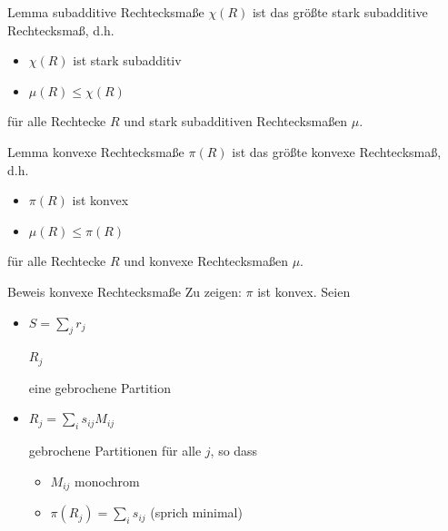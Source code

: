 \begin{frame}{}
    \begin{block}{Lemma subadditive Rechtecksma\ss{}e}
        $\chi(R)$ ist das gr\"o\ss{}te stark subadditive Rechtecksma\ss{}, d.h.
        \begin{itemize}
            \item $\chi(R)$ ist stark subadditiv
            \item $\mu(R) \leq \chi(R)$
        \end{itemize}
        f\"ur alle Rechtecke $R$ und stark subadditiven Rechtecksma\ss{}en $\mu$.
    \end{block}
    \pause
    \begin{block}{Lemma konvexe Rechtecksma\ss{}e}
        $\pi(R)$ ist das gr\"o\ss{}te konvexe Rechtecksma\ss{}, d.h.
        \begin{itemize}
            \item $\pi(R)$ ist konvex
            \item $\mu(R) \leq \pi(R)$
        \end{itemize}
        f\"ur alle Rechtecke $R$ und konvexe Rechtecksma\ss{}en $\mu$.
    \end{block}
\end{frame}

\begin{frame}[t]{Beweis konvexe Rechtecksma\ss{}e}
    Zu zeigen: $\pi$ ist konvex.
    \pause
    Seien
    \begin{itemize}
        \item $S = \sum_{j} r_j$ \colorbox{dominant_blue}{\strut$R_j$} eine gebrochene Partition
        \item \colorbox{dominant_blue}{\strut$R_j = \sum_{i} s_{ij} M_{ij}$} gebrochene Partitionen f\"ur alle $j$, so dass
        \begin{itemize}
            \item $M_{ij}$ monochrom
            \item $\pi(R_j) = \sum_i s_{ij}$ (sprich minimal) 
        \end{itemize}
    \end{itemize}
\end{frame}

